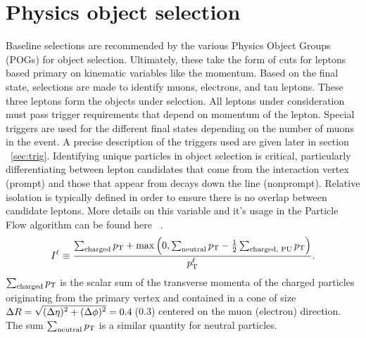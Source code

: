 \section{Physics object selection} 
\label{sec:objsel}
Baseline selections are recommended by the various Physics Object Groups (POGs) for object selection. Ultimately, these take the form of cuts for leptons based primary on kinematic variables like the momentum. 
Based on the final state, selections are made to identify muons, electrons, and tau leptons. These three leptons form the objects under selection. 
All leptons under consideration must pass trigger requirements that depend on momentum of the lepton. Special triggers are used for the different final states depending on the number of muons in the event. A precise description of the triggers used are given later in section ~\ref{sec:trig}.
Identifying unique particles in object selection is critical, particularly differentiating between lepton candidates that come from the interaction vertex (prompt) and those that appear from decays down the line (nonprompt). Relative isolation is typically defined in order to ensure there is no overlap between candidate leptons. More details on this variable and it's usage in the Particle Flow algorithm can be found here  ~\cite{Sirunyan_2017}. 
\begin{equation}
I^{\ell} \equiv \frac{\sum_\text{charged}  p_{\mathrm{T}} + \max\left( 0, \sum_\text{neutral}  p_{\mathrm{T}}
                                         - \frac{1}{2} \sum_\text{charged, PU} p_{\mathrm{T}}  \right )}{p_{\mathrm{T}}^{\ell}}.
\label{eq:reconstruction_isolation}
\end{equation}
$\sum_\text{charged}  p_{\mathrm{T}}$ is the scalar sum of the
transverse momenta of the charged particles originating from
the primary vertex and contained in a cone of size
$\Delta R = \sqrt{\smash[b]{(\Delta \eta)^2 + (\Delta \phi)^2}} = 0.4$\,(0.3)
centered on the muon (electron) direction. The sum $\sum_\text{neutral}  p_{\mathrm{T}}$ is
a similar quantity for neutral particles.


